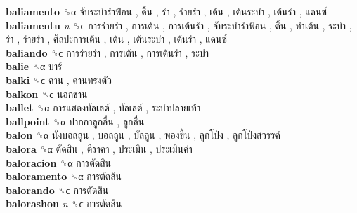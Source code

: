 \textbf{baliamento} ␝α   จับระบำรำฟ้อน ,  ดิ้น ,  รำ ,  ร่ายรำ ,  เต้น ,  เต้นระบำ ,  เต้นรำ ,  แดนซ์   \\
\textbf{baliamentu} \emph{n}  ␝ϲ   การร่ายรำ ,  การเต้น ,  การเต้นรำ ,  จับระบำรำฟ้อน ,  ดิ้น ,  ท่าเต้น ,  ระบำ ,  รำ ,  ร่ายรำ ,  ศิลปะการเต้น ,  เต้น ,  เต้นระบำ ,  เต้นรำ ,  แดนซ์   \\
\textbf{baliando} ␝ϲ   การร่ายรำ ,  การเต้น ,  การเต้นรำ ,  ระบำ   \\
\textbf{balie} ␝α   บาร์   \\
\textbf{balki} ␝ϲ   คาน ,  คานทรงตัว   \\
\textbf{balkon} ␝ϲ   นอกชาน   \\
\textbf{ballet} ␝α   การแสดงบัลเลต์ ,  บัลเลต์ ,  ระบำปลายเท้า   \\
\textbf{ballpoint} ␝α   ปากกาลูกลื่น ,  ลูกลื่น   \\
\textbf{balon} ␝α   นั่งบอลลูน ,  บอลลูน ,  บัลลูน ,  พองขึ้น ,  ลูกโป่ง ,  ลูกโป่งสวรรค์   \\
\textbf{balora} ␝α   ตัดสิน ,  ตีราคา ,  ประเมิน ,  ประเมินค่า   \\
\textbf{baloracion} ␝α   การตัดสิน   \\
\textbf{baloramento} ␝α   การตัดสิน   \\
\textbf{balorando} ␝ϲ   การตัดสิน   \\
\textbf{balorashon} \emph{n}  ␝ϲ   การตัดสิน   \\

